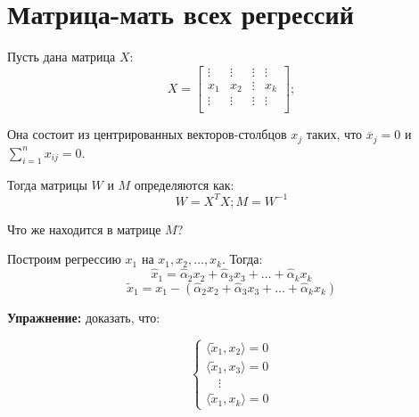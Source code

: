 \documentclass[12pt]{article} %
\theoremstyle{definition} %
\def \ha{\hat{\alpha}}
\def \hx{\hat{x}}
\def \tx{\tilde{x}}
\begin{document}
\section{Матрица-мать всех регрессий}
Пусть дана матрица $X$:
\[
X =  \begin{bmatrix}
           \vdots & \vdots & \vdots & \vdots \\
           x_1 & x_2 & \vdots & x_k \\
           \vdots & \vdots & \vdots & \vdots \\
         \end{bmatrix}
         ;
\]

Она состоит из центрированных векторов-столбцов $x_j$ таких, что $\overline{x}_j = 0$ и $\sum_{i=1}^n x_{ij} = 0$.

Тогда матрицы $W$ и $M$ определяются как: $$W = X^TX; M = W^{-1}$$ 

Что же находится в матрице $M$?

Построим регрессию $x_1$ на $x_1, x_2, \ldots, x_k$. Тогда: 
\[
\hx_1 = \ha_2 x_2 + \ha_3 x_3 + \ldots + \ha_k x_k
\]
\[
\tx_1 = x_1 - \left(\ha_2 x_2 + \ha_3 x_3 + \ldots + \ha_k x_k \right)
\]



\textbf{Упражнение:} доказать, что:

  \begin{equation*}
     \begin{cases}
       \langle \tx_1, x_2 \rangle = 0 \\
       \langle \tx_1, x_3 \rangle = 0 \\
       \quad\vdots \\
       \langle \tx_1, x_k \rangle = 0
    \end{cases}
  \end{equation*}
\end{document}
